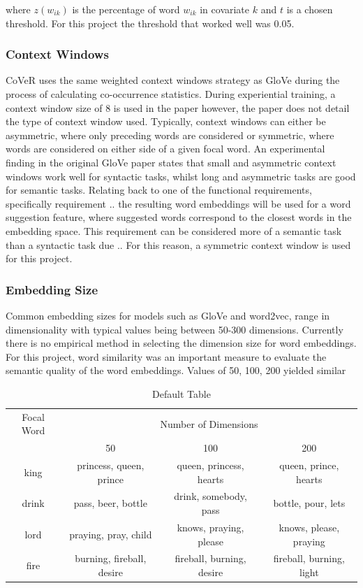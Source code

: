 \noindent
\newline
where \(z(w_{ik})\) is the percentage of word \(w_{ik}\) in covariate \(k\) and \(t\) is a chosen threshold. For this project the threshold that worked well was 0.05.
\subsubsection{Context Windows}
CoVeR uses the same weighted context windows strategy as GloVe during the process of calculating co-occurrence statistics. During experiential training, a context window size of 8 is used in the paper however, the paper does not detail the type of context window used. Typically, context windows can either be asymmetric, where only preceding words are considered or symmetric, where words are considered on either side of a given focal word. An experimental finding in the original GloVe paper states that small and asymmetric context windows work well for syntactic tasks, whilst long and asymmetric tasks are good for semantic tasks. Relating back to one of the functional requirements, specifically requirement .. the resulting word embeddings will be used for a word suggestion feature, where suggested words correspond to the closest words in the embedding space. This requirement can be considered more of a semantic task than a syntactic task due .. For this reason, a symmetric context window is used for this project.
\subsubsection{Embedding Size}
Common embedding sizes for models such as GloVe and word2vec, range in dimensionality with typical values being between 50-300 dimensions. Currently there is no empirical method in selecting the dimension size for word embeddings. For this project, word similarity was an important measure to evaluate the semantic quality of the word embeddings. Values of 50, 100, 200 yielded similar 

\begin{table}[htbp]
	\label{Tab:testembeddings}
	\begin{center}
		\begin{tabular}{|c|c|c|c|}
			\hline
			{Focal Word}& \multicolumn{3}{p{5cm}|}{\centering Number of Dimensions} \\
			\cline{2-4} & \multicolumn{1}{c|}{50} & \multicolumn{1}{c|}{100} & \multicolumn{1}{c|}{200} \\ \hline
			king & princess, queen, prince & queen, princess, hearts & queen, prince, hearts \\
			drink & pass, beer, bottle & drink, somebody, pass & bottle, pour, lets \\
			lord & praying, pray, child & knows, praying, please & knows, please, praying \\
			fire & burning, fireball, desire & fireball, burning, desire & fireball, burning, light \\
			\hline
		\end{tabular}
	\end{center}
	\caption{Default Table}
\end{table} 

